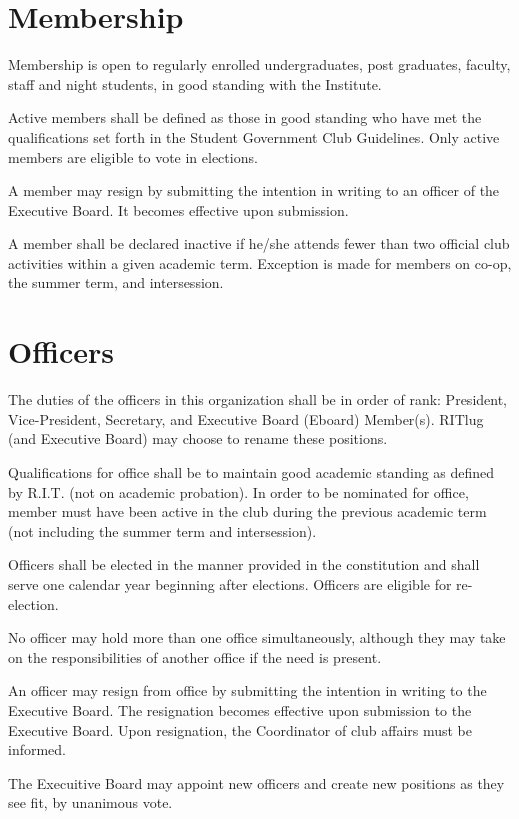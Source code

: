 \section{Membership}
\begin{subroutines}
\item Membership is open to regularly enrolled undergraduates, post graduates, faculty, staff and night students, in good standing with the Institute.
\item Active members shall be defined as those in good standing who have met the qualifications set forth in the Student Government Club Guidelines. Only active members are eligible to vote in elections.
\item A member may resign by submitting the intention in writing to an officer of the Executive Board. It becomes effective upon submission.
\item A member shall be declared inactive if he/she attends fewer than two official club activities within a given academic term. Exception is made for members on co-op, the summer term, and intersession.
\end{subroutines}

\section{Officers}
\begin{subroutines}
\item The duties of the officers in this organization shall be in order of rank: President, Vice-President, Secretary, and Executive Board (Eboard) Member(s). RITlug (and Executive Board) may choose to rename these positions.
\item Qualifications for office shall be to maintain good academic standing as defined by R.I.T. (not on academic probation). In order to be nominated for office, member must have been active in the club during the previous academic term (not including the summer term and intersession).
\item Officers shall be elected in the manner provided in the constitution and shall serve one calendar year beginning after elections. Officers are eligible for re-election.
\item No officer may hold more than one office simultaneously, although they may take on the responsibilities of another office if the need is present.
\item An officer may resign from office by submitting the intention in writing to the Executive Board. The resignation becomes effective upon submission to the Executive Board. Upon resignation, the Coordinator of club affairs must be informed.
\item The Execuitive Board may appoint new officers and create new positions as they see fit, by unanimous vote.
\end{subroutines}

